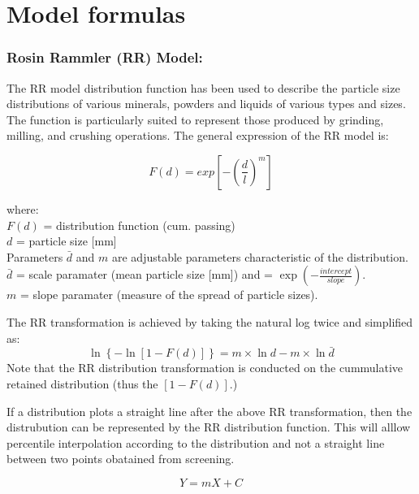 \documentclass[
]{article}
\author{}
\date{\vspace{-2.5em}}
\begin{document}
\hypertarget{model-formulas}{%
\section{Model formulas}\label{model-formulas}}

\hypertarget{rosin-rammler-rr-model}{%
\subsubsection{Rosin Rammler (RR) Model:}\label{rosin-rammler-rr-model}}

The RR model distribution function has been used to describe the
particle size distributions of various minerals, powders and liquids of
various types and sizes. The function is particularly suited to
represent those produced by grinding, milling, and crushing operations.
The general expression of the RR model is:

\begin{equation}

  F\left(d\right) = exp\left[-(\frac{d}{l})^{m} \right]

  \label{eq : RR}
\end{equation}

where:\\
\(F(d)\) = distribution function (cum. passing)\\
\(d\) = particle size {[}mm{]}\\
Parameters \(\bar{d}\) and \(m\) are adjustable parameters
characteristic of the distribution.\\
\(\bar{d}\) = scale paramater (mean particle size {[}mm{]}) and =
\(\exp\left({-\frac{intercept}{slope}}\right)\).\\
\(m\) = slope paramater (measure of the spread of particle sizes).

The RR transformation is achieved by taking the natural log twice and
simplified as:
\[\ln\left\{-\ln\left[1-F(d)\right] \right\} = m\times \ln d - m\times \ln \bar{d} \]
Note that the RR distribution transformation is conducted on the
cummulative retained distribution (thus the \(\left[1-F(d)\right]\).)

If a distribution plots a straight line after the above RR
transformation, then the distrubution can be represented by the RR
distribution function. This will alllow percentile interpolation
according to the distribution and not a straight line between two points
obatained from screening.

\[ Y=mX + C\]
\end{document}
